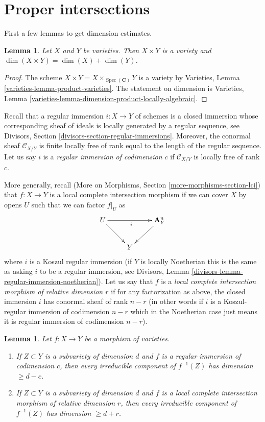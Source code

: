 \documentclass{stacks-project}
\theoremstyle{plain}
\newtheorem{lemma}[subsection]{Lemma}
\theoremstyle{definition}
\theoremstyle{remark}
\numberwithin{equation}{subsection}
\def\Spec{\mathop{\mathrm{Spec}}}
\begin{document}
\section{Proper intersections}
\label{section-intersect-properly}

\noindent
First a few lemmas to get dimension estimates.

\begin{lemma}
\label{lemma-dimension-product-varieties}
Let $X$ and $Y$ be varieties. Then $X \times Y$ is a variety and
$\dim(X \times Y) = \dim(X) + \dim(Y)$.
\end{lemma}

\begin{proof}
The scheme $X \times Y = X \times_{\Spec(\mathbf{C})} Y$ is a variety by
Varieties, Lemma \ref{varieties-lemma-product-varieties}.
The statement on dimension is
Varieties, Lemma \ref{varieties-lemma-dimension-product-locally-algebraic}.
\end{proof}

\noindent
Recall that a regular immersion $i : X \to Y$ of schemes
is a closed immersion whose
corresponding sheaf of ideals is locally generated by a regular sequence, see
Divisors, Section \ref{divisors-section-regular-immersions}.
Moreover, the conormal sheaf $\mathcal{C}_{X/Y}$ is finite locally free of
rank equal to the length of the regular sequence. Let us say $i$ is a
{\it regular immersion of codimension $c$}
if $\mathcal{C}_{X/Y}$ is locally free of rank $c$.

\medskip\noindent
More generally, recall
(More on Morphisms, Section \ref{more-morphisms-section-lci})
that $f : X \to Y$ is a local complete intersection
morphism if we can cover $X$ by opens $U$ such that we can factor
$f|_U$ as
$$
\xymatrix{
U \ar[rr]_i \ar[rd] & & \mathbf{A}^n_Y \ar[ld] \\
& Y
}
$$
where $i$ is a Koszul regular immersion (if $Y$ is locally Noetherian
this is the same as asking $i$ to be a regular immersion, see
Divisors, Lemma \ref{divisors-lemma-regular-immersion-noetherian}).
Let us say that $f$ is a {\it local complete intersection morphism
of relative dimension $r$} if for any factorization as above, the
closed immersion $i$ has conormal sheaf of rank $n - r$ (in other
words if $i$ is a Koszul-regular immersion of codimension $n - r$
which in the Noetherian case just means it is regular immersion of
codimension $n - r$).

\begin{lemma}
\label{lemma-pullback-by-regular-immersion}
Let $f : X \to Y$ be a morphism of varieties.
\begin{enumerate}
\item If $Z \subset Y$ is a subvariety of dimension $d$ and $f$ is a regular
immersion of codimension $c$, then every irreducible component
of $f^{-1}(Z)$ has dimension $\geq d - c$.
\item If $Z \subset Y$ is a subvariety of dimension $d$ and
$f$ is a local complete intersection morphism of relative dimension $r$,
then every irreducible component of $f^{-1}(Z)$ has dimension $\geq d + r$.
\end{enumerate}
\end{lemma}
\end{document}
